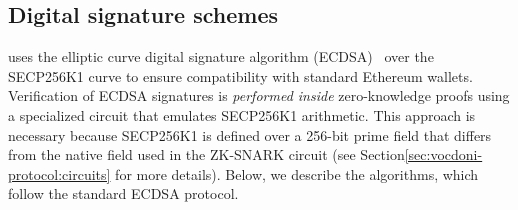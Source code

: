 \subsection{Digital signature schemes}
\label{sec:cryptographic-primitives:signatures}

\Davinci uses the elliptic curve digital signature algorithm (ECDSA)~\cite{johnson01ecdsa} over the SECP256K1 curve to ensure compatibility with standard Ethereum wallets. %
%
%
Verification of ECDSA signatures is \textit{performed inside} zero-knowledge proofs using a specialized circuit that emulates SECP256K1 arithmetic. This approach is necessary because SECP256K1 is defined over a 256-bit prime field that differs from the native field used in the ZK-SNARK circuit (see Section\ref{sec:vocdoni-protocol:circuits} for more details). Below, we describe the algorithms, which follow the standard ECDSA protocol.

